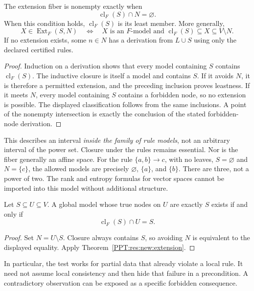 \begin{PPTtheorem}
\label{PPT:res:new:extension}
The extension fiber is nonempty exactly when
\[
 \operatorname{cl}_F(S)\cap N=\varnothing.
\]
When this condition holds, $\operatorname{cl}_F(S)$ is its least member. More generally,
\[
 X\in\operatorname{Ext}_F(S,N)
 \quad\Longleftrightarrow\quad
 X\text{ is an }F\text{-model and }
 \operatorname{cl}_F(S)\subseteq X\subseteq V\setminus N.
\]
If no extension exists, some $n\in N$ has a derivation from $L\cup S$ using only the declared certified rules.
\end{PPTtheorem}
\begin{proof}
Induction on a derivation shows that every model containing $S$ contains $\operatorname{cl}_F(S)$. The inductive closure is itself a model and contains $S$. If it avoids $N$, it is therefore a permitted extension, and the preceding inclusion proves leastness. If it meets $N$, every model containing $S$ contains a forbidden node, so no extension is possible. The displayed classification follows from the same inclusions. A point of the nonempty intersection is exactly the conclusion of the stated forbidden-node derivation.
\end{proof}

This describes an interval \emph{inside the family of rule models}, not an arbitrary interval of the power set. Closure under the rules remains essential. Nor is the fiber generally an affine space. For the rule $\{a,b\}\to c$, with no leaves, $S=\varnothing$ and $N=\{c\}$, the allowed models are precisely $\varnothing$, $\{a\}$, and $\{b\}$. There are three, not a power of two. The rank and entropy formulas for vector spaces cannot be imported into this model without additional structure.

\begin{PPTcorollary}
\label{PPT:res:new:partial}
Let $S\subseteq U\subseteq V$. A global model whose true nodes on $U$ are exactly $S$ exists if and only if
\[
 \operatorname{cl}_F(S)\cap U=S.
\]
\end{PPTcorollary}
\begin{proof}
Set $N=U\setminus S$. Closure always contains $S$, so avoiding $N$ is equivalent to the displayed equality. Apply Theorem~\ref{PPT:res:new:extension}.
\end{proof}

In particular, the test works for partial data that already violate a local rule. It need not assume local consistency and then hide that failure in a precondition. A contradictory observation can be exposed as a specific forbidden consequence.

